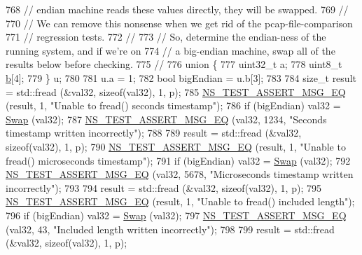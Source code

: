 \begin{DoxyCode}
768   \textcolor{comment}{// endian machine reads these values directly, they will be swapped.}
769   \textcolor{comment}{//}
770   \textcolor{comment}{// We can remove this nonsense when we get rid of the pcap-file-comparison}
771   \textcolor{comment}{// regression tests.}
772   \textcolor{comment}{//}
773   \textcolor{comment}{// So, determine the endian-ness of the running system, and if we're on}
774   \textcolor{comment}{// a big-endian machine, swap all of the results below before checking.}
775   \textcolor{comment}{//}
776   \textcolor{keyword}{union }\{
777     uint32\_t a;
778     uint8\_t  \hyperlink{buildings__pathloss_8m_a21ad0bd836b90d08f4cf640b4c298e7c}{b}[4];
779   \} u;
780 
781   u.a = 1;
782   \textcolor{keywordtype}{bool} bigEndian = u.b[3];
783 
784   \textcolor{keywordtype}{size\_t} result = std::fread (&val32, \textcolor{keyword}{sizeof}(val32), 1, p);
785   \hyperlink{group__testing_ga2a9d78cffb3db8e867c35fff0b698cf5}{NS\_TEST\_ASSERT\_MSG\_EQ} (result, 1, \textcolor{stringliteral}{"Unable to fread() seconds timestamp"});
786   \textcolor{keywordflow}{if} (bigEndian) val32 = \hyperlink{pcap-file-test-suite_8cc_a9baeceaeb66adfc7bddae33a81ad8fa7}{Swap} (val32);
787   \hyperlink{group__testing_ga2a9d78cffb3db8e867c35fff0b698cf5}{NS\_TEST\_ASSERT\_MSG\_EQ} (val32, 1234, \textcolor{stringliteral}{"Seconds timestamp written incorrectly"});
788 
789   result = std::fread (&val32, \textcolor{keyword}{sizeof}(val32), 1, p);
790   \hyperlink{group__testing_ga2a9d78cffb3db8e867c35fff0b698cf5}{NS\_TEST\_ASSERT\_MSG\_EQ} (result, 1, \textcolor{stringliteral}{"Unable to fread() microseconds timestamp"});
791   \textcolor{keywordflow}{if} (bigEndian) val32 = \hyperlink{pcap-file-test-suite_8cc_a9baeceaeb66adfc7bddae33a81ad8fa7}{Swap} (val32);
792   \hyperlink{group__testing_ga2a9d78cffb3db8e867c35fff0b698cf5}{NS\_TEST\_ASSERT\_MSG\_EQ} (val32, 5678, \textcolor{stringliteral}{"Microseconds timestamp written incorrectly"});
793 
794   result = std::fread (&val32, \textcolor{keyword}{sizeof}(val32), 1, p);
795   \hyperlink{group__testing_ga2a9d78cffb3db8e867c35fff0b698cf5}{NS\_TEST\_ASSERT\_MSG\_EQ} (result, 1, \textcolor{stringliteral}{"Unable to fread() included length"});
796   \textcolor{keywordflow}{if} (bigEndian) val32 = \hyperlink{pcap-file-test-suite_8cc_a9baeceaeb66adfc7bddae33a81ad8fa7}{Swap} (val32);
797   \hyperlink{group__testing_ga2a9d78cffb3db8e867c35fff0b698cf5}{NS\_TEST\_ASSERT\_MSG\_EQ} (val32, 43, \textcolor{stringliteral}{"Included length written incorrectly"});
798 
799   result = std::fread (&val32, \textcolor{keyword}{sizeof}(val32), 1, p);

\end{DoxyCode}
